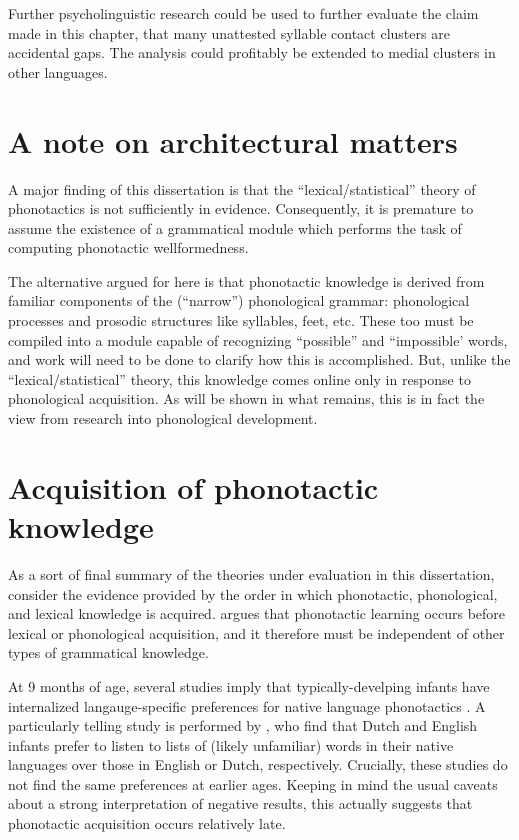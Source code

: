 Further psycholinguistic research could be used to further evaluate the claim made in this chapter, that many unattested syllable contact clusters are accidental gaps.
The analysis could profitably be extended to medial clusters in other languages.

\section{A note on architectural matters}

A major finding of this dissertation is that the ``lexical/statistical'' theory of phonotactics is not sufficiently in evidence.
Consequently, it is premature to assume the existence of a grammatical module which performs the task of computing phonotactic wellformedness.

The alternative argued for here is that phonotactic knowledge is derived from familiar components of the (``narrow'') phonological grammar: phonological processes and prosodic structures like syllables, feet, etc. 
These too must be compiled into a module capable of recognizing ``possible'' and ``impossible' words, and work will need to be done to clarify how this is accomplished. 
But, unlike the ``lexical/statistical'' theory, this knowledge comes online only in response to phonological acquisition. 
As will be shown in what remains, this is in fact the view from research into phonological development.

\section{Acquisition of phonotactic knowledge}
\label{s:aopk}

As a sort of final summary of the theories under evaluation in this dissertation, consider the evidence provided by the order in which phonotactic, phonological, and lexical knowledge is acquired.
\citet{Hayes2004b} argues that phonotactic learning occurs before lexical or phonological acquisition, and it therefore must be independent of other types of grammatical knowledge.

At 9 months of age, several studies imply that typically-develping infants have internalized langauge-specific preferences for native language phonotactics \citep{Friederici1993,Jusczyk1994}.
A particularly telling study is performed by \citet{Jusczyk1993b}, who find that Dutch and English infants prefer to listen to lists of (likely unfamiliar) words in their native languages over those in English or Dutch, respectively.
Crucially, these studies do not find the same preferences at earlier ages.
Keeping in mind the usual caveats about a strong interpretation of negative results, this actually suggests that phonotactic acquisition occurs relatively late.

